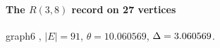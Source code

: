 \paragraph{The $R(3,8)$ record on 27 vertices} graph6 , $|E|=91$, $\theta=10.060569$, $\Delta=3.060569$.

